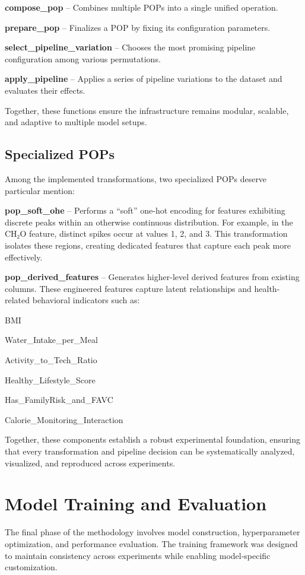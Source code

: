 \textbf{compose\_pop} – Combines multiple POPs into a single unified operation.

\textbf{prepare\_pop} – Finalizes a POP by fixing its configuration parameters.

\textbf{select\_pipeline\_variation} – Chooses the most promising pipeline configuration among various permutations.

\textbf{apply\_pipeline} – Applies a series of pipeline variations to the dataset and evaluates their effects.

Together, these functions ensure the infrastructure remains modular, scalable, and adaptive to multiple model setups.

\subsection{Specialized POPs}\label{subsec:specialized-pops}
Among the implemented transformations, two specialized POPs deserve particular mention:

\textbf{pop\_soft\_ohe} – Performs a “soft” one-hot encoding for features exhibiting discrete peaks within an otherwise continuous distribution.
For example, in the CH₂O feature, distinct spikes occur at values 1, 2, and 3.
This transformation isolates these regions, creating dedicated features that capture each peak more effectively.

\textbf{pop\_derived\_features} – Generates higher-level derived features from existing columns.
These engineered features capture latent relationships and health-related behavioral indicators such as:

BMI

Water\_Intake\_per\_Meal

Activity\_to\_Tech\_Ratio

Healthy\_Lifestyle\_Score

Has\_FamilyRisk\_and\_FAVC

Calorie\_Monitoring\_Interaction

Together, these components establish a robust experimental foundation, ensuring that every transformation and pipeline decision can be systematically analyzed, visualized, and reproduced across experiments.


\section{Model Training and Evaluation}\label{sec:model-training-and-evaluation}
The final phase of the methodology involves model construction, hyperparameter optimization, and performance evaluation.
The training framework was designed to maintain consistency across experiments while enabling model-specific customization.


